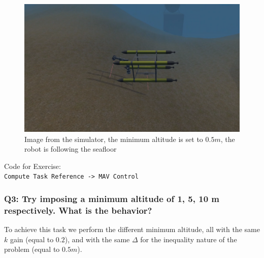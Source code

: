 \documentclass{article}
\begin{document}
\begin{figure}[t]
    \centering
    \includegraphics[scale=0.4]{122_MAV1m.png}
    \caption{Image from the simulator, the minimum altitude is set to $0.5m$, the robot is following the seafloor}
    \label{images_2_1}
\end{figure}

\colorbox{mygray}{\parbox{0.9\textwidth}{Code for Exercise: \\
\texttt{Compute Task Reference -> MAV Control}\\
}}

\subsubsection{Q3: Try imposing a minimum altitude of 1, 5, 10 m respectively. What is the behavior?}
To achieve this task we perform the different minimum altitude, all with the same $k$ gain (equal to $0.2$), and with the same $\Delta$ for the inequality nature of the problem (equal to $0.5 m$).
\end{document}
